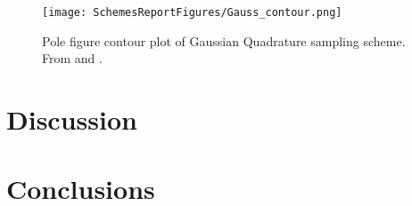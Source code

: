 \documentclass{article}
\begin{document}
\begin{figure}[H]
    \centering
    \texttt{[image: SchemesReportFigures/Gauss\_contour.png]}
    \caption{Pole figure contour plot of Gaussian Quadrature sampling scheme. From \cite{Lan1} and \cite{Lan2}.}
\end{figure}




\section{Discussion}


\section{Conclusions}




%

\end{document}
